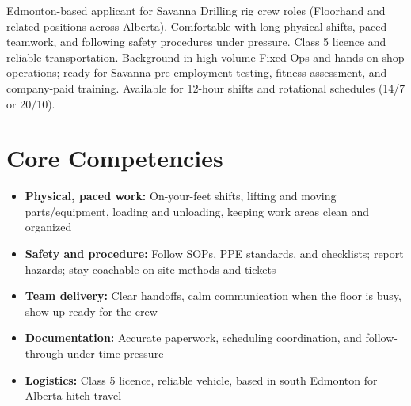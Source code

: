 \documentclass[11pt,a4paper,sans]{moderncv}
\begin{document}
\makecvtitle

\vspace{4pt}
\small{Edmonton-based applicant for Savanna Drilling rig crew roles (Floorhand and related positions across Alberta). Comfortable with long physical shifts, paced teamwork, and following safety procedures under pressure. Class 5 licence and reliable transportation. Background in high-volume Fixed Ops and hands-on shop operations; ready for Savanna pre-employment testing, fitness assessment, and company-paid training. Available for 12-hour shifts and rotational schedules (14/7 or 20/10).}

\section{Core Competencies}
\vspace{1pt}
\begin{itemize}
\item \textbf{Physical, paced work:} On-your-feet shifts, lifting and moving parts/equipment, loading and unloading, keeping work areas clean and organized
\item \textbf{Safety and procedure:} Follow SOPs, PPE standards, and checklists; report hazards; stay coachable on site methods and tickets
\item \textbf{Team delivery:} Clear handoffs, calm communication when the floor is busy, show up ready for the crew
\item \textbf{Documentation:} Accurate paperwork, scheduling coordination, and follow-through under time pressure
\item \textbf{Logistics:} Class 5 licence, reliable vehicle, based in south Edmonton for Alberta hitch travel
\end{itemize}
\end{document}
